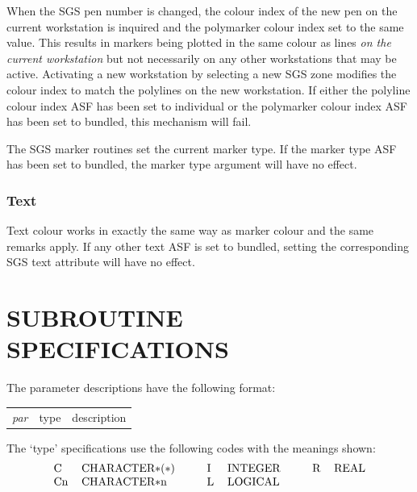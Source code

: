 \documentclass[11pt]{article}
\newenvironment{latexonly}{}{}
\begin{document}
When the SGS pen number is changed, the colour index of the new pen on the
current workstation is inquired and the polymarker colour index set to the same
value.
This results in markers being plotted in the same colour as lines {\em on the
current workstation}\/ but not necessarily on any other workstations that may be
active.
Activating a new workstation by selecting a new SGS zone modifies the colour
index to match the polylines on the new workstation.
If either the polyline colour index ASF has been set to individual or the
polymarker colour index ASF has been set to bundled, this mechanism will fail.

The SGS marker routines set the current marker type.
If the marker type ASF has been set to bundled, the marker type argument will
have no effect.

\subsubsection* {Text}

Text colour works in exactly the same way as marker colour and the same remarks
apply.
If any other text ASF is set to bundled, setting the corresponding SGS text
attribute will have no effect.

\section {SUBROUTINE SPECIFICATIONS}\label{app-subroutines}

\begin{latexonly}
The parameter descriptions have the following format:

\begin{tabular}{lll}
\em par&type&description
\end{tabular}

The `type' specifications use the following codes with the meanings shown:
\[\begin{tabular}{ll@{\hspace{1cm}}ll@{\hspace{1cm}}ll}
C&CHARACTER$\ast$($\ast$)&I&INTEGER&R&REAL\\
Cn&CHARACTER$\ast$n&L&LOGICAL
\end{tabular}\]
\end{latexonly}
\end{document}
